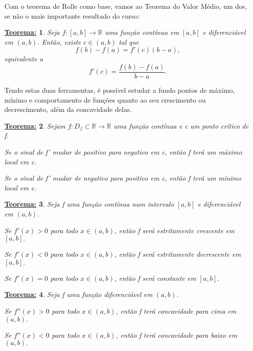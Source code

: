 \documentclass{article}
\newtheorem*{thm*}{\underline{Teorema:}}
\begin{document}
    Com o teorema de Rolle como base, vamos ao Teorema do Valor M\'edio, um dos, se n\~ao o mais importante resultado do curso:
    \begin{thm*}
        Seja $f:[a, b]\rightarrow\mathbb{R}$ uma fun\c c\~ao cont\'inua em $[a, b]$ e diferenci\'avel em $(a, b)$. Ent\~ao, existe $c\in(a, b)$ tal que
        $$
            f(b) - f(a) = f'(c)(b - a),
        $$
        equivalente a 
        $$
            f'(c) = \frac{f(b) - f(a)}{b - a}.
        $$
    \end{thm*}

    Tendo estas duas ferramentas, \'e poss\'ivel estudar a fundo pontos de m\'aximo, m\'inimo e comportamento de fun\c c\~oes quanto ao seu crescimento ou decrescimento,
    al\'em da concavidade delas.

    \begin{thm*}
        Sejam $f:D_f\subset\mathbb{R}\rightarrow\mathbb{R}$ uma fun\c c\~ao cont\'inua e c um ponto cr\'itico de f.

        \quad Se o sinal de f' mudar de positivo para negativo em c, ent\~ao f ter\'a um m\'aximo local em c.

        \quad Se o sinal de f' mudar de negativo para positivo em c, ent\~ao f ter\'a um m\'inimo local em c.
    \end{thm*}

    \begin{thm*}
        Seja f uma fun\c c\~ao cont\'inua num intervalo $[a, b]$ e diferenci\'avel em $(a, b)$. 
        
        \quad Se $f'(x) > 0$ para todo $x\in(a, b)$, ent\~ao f ser\'a estritamente crescente em $[a, b].$

        \quad Se $f'(x) < 0$ para todo $x\in(a, b)$, ent\~ao f ser\'a estritamente decrescente em $[a, b].$

        \quad Se $f'(x) = 0$ para todo $x\in(a, b)$, ent\~ao f ser\'a constante em $[a, b].$
    \end{thm*}

    \begin{thm*}
        Seja f uma fun\c c\~ao diferenci\'avel em $(a, b)$.

        \quad Se $f{''}(x) > 0$ para todo $x\in(a, b)$, ent\~ao f ter\'a concavidade para cima em $(a, b).$

        \quad Se $f{''}(x) < 0$ para todo $x\in(a, b)$, ent\~ao f ter\'a concavidade para baixo em $(a, b).$
    \end{thm*}
    
\end{document}
